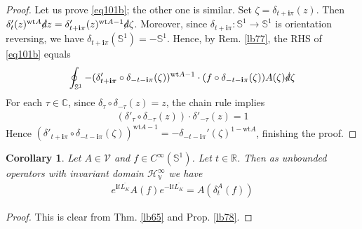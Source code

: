 \documentclass[12pt,b5paper,notitlepage]{article}
\theoremstyle{definition}
\theoremstyle{plain}
\newtheorem{co}[df]{Corollary}
\newcommand{\mc}{\mathcal}
\newcommand{\ovl}{\overline}
\newcommand{\im}{\mathbf{i}}
\newcommand{\Vbb}{\mathbb V}
\newcommand{\Cbb}{\mathbb C}
\newcommand{\Rbb}{\mathbb R}
\newcommand{\wt}{\mathrm{wt}}
\newcommand{\Sbb}{{\mathbb S}}
\newcommand{\ointn}{\oint\nolimits}
\newcommand{\sd}{\slashed{d}}
\newcommand{\MV}{\mathcal V}
\numberwithin{equation}{section}
\begin{document}
\begin{proof}
Let us prove \eqref{eq101b}; the other one is similar. Set  $\zeta=\delta_{t+\im\pi}(z)$. Then $\delta'_t(z)^{\wt A}\sd z=\delta'_{t+\im\pi}(z)^{\wt A-1}\sd\zeta$. Moreover, since $\delta_{t+\im\pi}:\Sbb^1\rightarrow\Sbb^1$ is orientation reversing, we have $\delta_{t+\im\pi}(\Sbb^1)=-\Sbb^1$. Hence, by Rem. \ref{lb77}, the RHS of \eqref{eq101b} equals
\begin{align*}
\ointn_{\Sbb^1}-(\delta'_{t+\im\pi}\circ\delta_{-t-\im\pi}(\zeta))^{\wt A-1}\cdot (f\circ\delta_{-t-\im\pi}(\zeta))A(\zeta)\sd\zeta
\end{align*}
For each $\tau\in\Cbb$, since $\delta_\tau\circ\delta_{-\tau}(z)=z$, the chain rule implies
\begin{align*}
(\delta'_\tau\circ\delta_{-\tau}(z))\cdot\delta'_{-\tau}(z)=1
\end{align*}
Hence $(\delta'_{t+\im\pi}\circ\delta_{-t-\im\pi}(\zeta))^{\wt A-1}=-\delta_{-t-\im\pi}'(\zeta)^{1-\wt A}$, finishing the proof.
\end{proof}









\begin{co}\label{lbb17}
Let $A\in\MV$ and $f\in C^\infty(\Sbb^1)$. Let $t\in\Rbb$. Then as unbounded operators with invariant domain $\mc H^\infty_\Vbb$ we have
\begin{align}
e^{\im t\ovl{L_K}}A(f)e^{-\im t{\ovl{L_K}}}=A(\delta^A_t(f))
\end{align}
\end{co}

\begin{proof}
This is clear from Thm. \ref{lb65} and Prop. \ref{lb78}.
\end{proof}










\subsection{}
\end{document}

